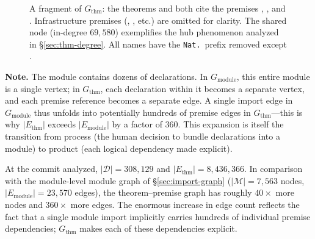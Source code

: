 \begin{figure}[H]
\centering
{}
\caption{A fragment of $G_{\mathrm{thm}}$: the theorems  and  both cite the premises , , and . Infrastructure premises (, , etc.) are omitted for clarity. The shared node  (in-degree $69{,}580$) exemplifies the hub phenomenon analyzed in \S\ref{sec:thm-degree}. All names have the \texttt{Nat.}\ prefix removed except .}
\label{fig:thm-fragment}
\end{figure}

\noindent\textbf{Note.}
The module  contains dozens of declarations. In $G_{\mathrm{module}}$, this entire module is a single vertex; in $G_{\mathrm{thm}}$, each declaration within it becomes a separate vertex, and each premise reference becomes a separate edge. A single import edge in $G_{\mathrm{module}}$ thus unfolds into potentially hundreds of premise edges in $G_{\mathrm{thm}}$---this is why $|E_{\mathrm{thm}}|$ exceeds $|E_{\mathrm{module}}|$ by a factor of $360$. This expansion is itself the transition from process (the human decision to bundle declarations into a module) to product (each logical dependency made explicit).

At the commit analyzed, $|\mathcal{D}| = 308{,}129$ and $|E_{\mathrm{thm}}| = 8{,}436{,}366$. In comparison with the module-level module graph of \S\ref{sec:import-graph} ($|\mathcal{M}| = 7{,}563$ nodes, $|E_{\mathrm{module}}| = 23{,}570$ edges), the theorem--premise graph has roughly $40\times$ more nodes and $360\times$ more edges. The enormous increase in edge count reflects the fact that a single module import implicitly carries hundreds of individual premise dependencies; $G_{\mathrm{thm}}$ makes each of these dependencies explicit.


